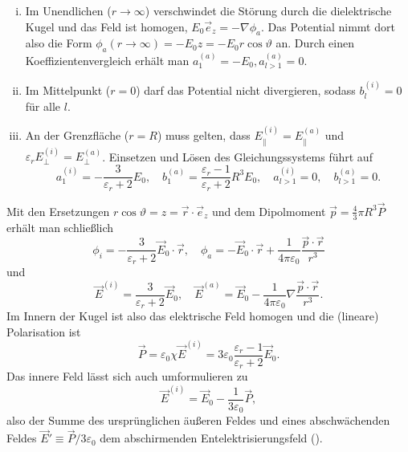 \begin{enumerate}[i)]
	\item Im Unendlichen ($r\rightarrow \infty $) verschwindet die Störung durch die dielektrische Kugel und das Feld ist homogen, $E_{0}\vec {e}_{z}=-\nabla \phi _{a}$. Das Potential nimmt dort also die Form $\phi _{a}\left(r\rightarrow \infty \right)=-E_{0}z=-E_{0}r\cos \vartheta $ an. Durch einen Koeffizientenvergleich erhält man $a_{1}^{\left(a\right)}=-E_{0}, a_{l>1}^{\left(a\right)}=0$.

	\item Im Mittelpunkt ($r=0$) darf das Potential nicht divergieren, sodass $b_{l}^{\left(i\right)}=0$ für alle $l$.

	\item An der Grenzfläche ($r=R$) muss gelten, dass $E_{\parallel }^{\left(i\right)}=E_{\parallel }^{\left(a\right)}$ und $\varepsilon _{r}E_{\perp }^{\left(i\right)}=E_{\perp }^{\left(a\right)}$. Einsetzen und Lösen des Gleichungssystems führt auf
	      \begin{equation*}
		      a_{1}^{\left(i\right)}=-\frac{3}{\varepsilon _{r}+2}E_{0},\quad b_{1}^{\left(a\right)}=\frac{\varepsilon _{r}-1}{\varepsilon _{r}+2}R^{3}E_{0},\quad a_{l>1}^{\left(i\right)}=0,\quad b_{l>1}^{\left(a\right)}=0.
	      \end{equation*}
\end{enumerate}

Mit den Ersetzungen $r\cos \vartheta =z=\vec {r}\cdot \vec {e}_{z}$ und dem Dipolmoment $\vec {p}=\frac{4}{3}\pi R^{3}\vec {P}$ erhält man schließlich
\begin{equation*}
	\phi _{i}=-\frac{3}{\varepsilon _{r}+2}\vec {E}_{0}\cdot \vec {r}, \quad\phi _{a}=-\vec {E}_{0}\cdot \vec {r}+\frac{1}{4\pi \varepsilon _{0}}\frac{\vec {p}\cdot \vec {r}}{r^{3}}
\end{equation*}
und
\begin{equation*}
	\vec {E}^{\left(i\right)}=\frac{3}{\varepsilon _{r}+2}\vec {E}_{0}, \quad\vec {E}^{\left(a\right)}=\vec {E}_{0}-\frac{1}{4\pi \varepsilon _{0}}\nabla \frac{\vec {p}\cdot \vec {r}}{r^{3}}.
\end{equation*}
Im Innern der Kugel ist also das elektrische Feld homogen und die (lineare) Polarisation ist
\begin{equation*}
	\vec {P}=\varepsilon _{0}\chi \vec {E}^{\left(i\right)}=3\varepsilon _{0}\frac{\varepsilon _{r}-1}{\varepsilon _{r}+2}\vec {E}_{0}.
\end{equation*}
Das innere Feld lässt sich auch umformulieren zu
\begin{equation*}
	\vec {E}^{\left(i\right)}=\vec {E}_{0}-\frac{1}{3\varepsilon _{0}}\vec {P},
\end{equation*}
also der Summe des ursprünglichen äußeren Feldes und eines abschwächenden Feldes $\vec {E}'\equiv \vec {P}/3\varepsilon _{0}$ \textendash{} dem abschirmenden Entelektrisierungsfeld ().

